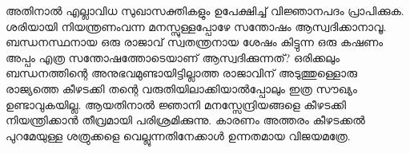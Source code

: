 അതിനാൽ എല്ലാവിധ സുഖാസക്തികളും ഉപേക്ഷിച്ച് വിജ്ഞാനപദം പ്രാപിക്കുക. ശരിയായി നിയന്ത്രണംവന്ന മനസ്സുള്ളപ്പോഴേ സന്തോഷം ആസ്വദിക്കാനാവൂ. ബന്ധനസ്ഥനായ ഒരു രാജാവ് സ്വതന്ത്രനായ ശേഷം കിട്ടുന്ന ഒരു കഷണം അപ്പം എത്ര സന്തോഷത്തോടെയാണ്  ആസ്വദിക്കുന്നത്? ഒരിക്കലും ബന്ധനത്തിന്റെ അനുഭവമുണ്ടായിട്ടില്ലാത്ത രാജാവിന്‌ അടുത്തുള്ളൊരു രാജ്യത്തെ കീഴടക്കി തന്റെ വരുതിയിലാക്കിയാൽപ്പോലും ഇത്ര സൗഖ്യം ഉണ്ടാവുകയില്ല. ആയതിനാൽ ജ്ഞാനി മനസ്സേന്ദ്രിയങ്ങളെ കീഴടക്കി നിയന്ത്രിക്കാൻ തീവ്രമായി പരിശ്രമിക്കുന്നു. കാരണം അത്തരം കീഴടക്കൽ പുറമേയുള്ള ശത്രുക്കളെ വെല്ലുന്നതിനേക്കാൾ ഉന്നതമായ വിജയമത്രേ. 

